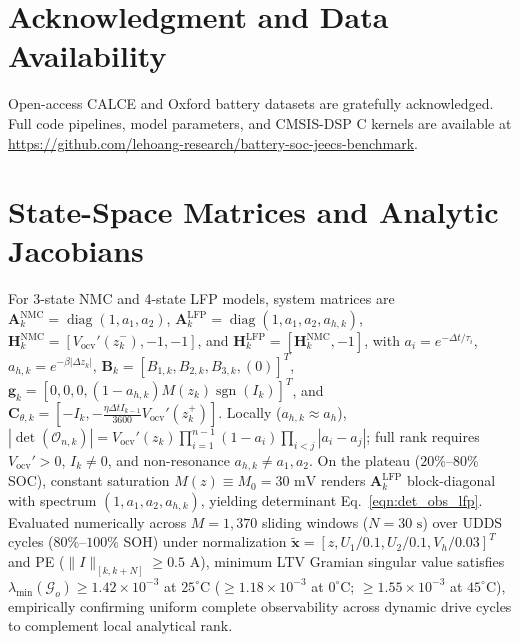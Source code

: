 \documentclass[balance,nocopyright,upint,varvw,hyphenate,barcolor=NavyBlue,nolists]{asmejour}
\begin{document}
\section*{Acknowledgment and Data Availability}
Open-access CALCE and Oxford battery datasets are gratefully acknowledged. Full code pipelines, model parameters, and CMSIS-DSP C kernels are available at \url{https://github.com/lehoang-research/battery-soc-jeecs-benchmark}.

\appendix
\section{State-Space Matrices and Analytic Jacobians\label{app:jacobians}}
For 3-state NMC and 4-state LFP models, system matrices are $\mathbf{A}_k^{\text{NMC}} = \operatorname{diag}(1, a_1, a_2)$, $\mathbf{A}_k^{\text{LFP}} = \operatorname{diag}(1, a_1, a_2, a_{h,k})$, $\mathbf{H}_k^{\text{NMC}} = [V_{\text{ocv}}'(\hat{z}_k^-), -1, -1]$, and $\mathbf{H}_k^{\text{LFP}} = [\mathbf{H}_k^{\text{NMC}}, -1]$, with $a_i = e^{-\Delta t/\tau_i}$, $a_{h,k} = e^{-\beta|\Delta z_k|}$, $\mathbf{B}_k = [B_{1,k}, B_{2,k}, B_{3,k}, (0)]^T$, $\mathbf{g}_k = [0, 0, 0, (1 - a_{h,k}) M(z_k) \operatorname{sgn}(I_k)]^T$, and $\mathbf{C}_{\theta,k} = [-I_k, -\tfrac{\eta \Delta t I_{k-1}}{3600} V_{\text{ocv}}'(\hat{z}_k^+)]$. Locally ($a_{h,k} \approx a_h$), $|\det(\mathcal{O}_{n,k})| = V_{\text{ocv}}'(z_k) \prod_{i=1}^{n-1}(1 - a_i) \prod_{i < j} |a_i - a_j|$; full rank requires $V_{\text{ocv}}' > 0$, $I_k \ne 0$, and non-resonance $a_{h,k} \ne a_1, a_2$. On the plateau ($20\%\text{--}80\%$ SOC), constant saturation $M(z) \equiv M_0 = 30\text{ mV}$ renders $\mathbf{A}_k^{\text{LFP}}$ block-diagonal with spectrum $(1, a_1, a_2, a_{h,k})$, yielding determinant Eq.~\eqref{eqn:det_obs_lfp}. Evaluated numerically across $M = 1,370$ sliding windows ($N=30\text{ s}$) over UDDS cycles ($80\%\text{--}100\%$ SOH) under normalization $\tilde{\mathbf{x}} = [z, U_1/0.1, U_2/0.1, V_h/0.03]^T$ and PE ($\|I\|_{[k,k+N]} \ge 0.5\text{ A}$), minimum LTV Gramian singular value satisfies $\lambda_{\min}(\mathcal{G}_o) \ge 1.42 \times 10^{-3}$ at $25^\circ\text{C}$ ($\ge 1.18 \times 10^{-3}$ at $0^\circ\text{C}$; $\ge 1.55 \times 10^{-3}$ at $45^\circ\text{C}$), empirically confirming uniform complete observability across dynamic drive cycles to complement local analytical rank.
\end{document}
